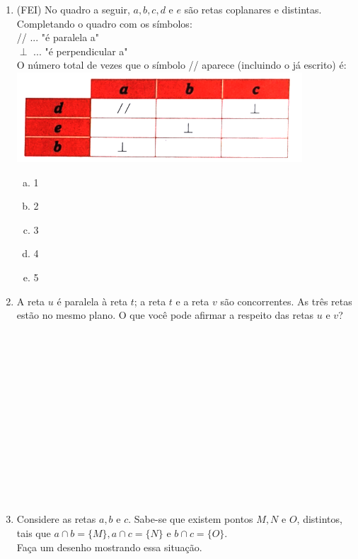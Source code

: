 \documentclass[a4paper,14pt]{article}
\begin{document}
\begin{multicols}{2}
\begin{enumerate}
   			\item (FEI) No quadro a seguir, $a, b, c, d$ e $e$ são retas coplanares e distintas. Completando o quadro com os símbolos: \\ // ... "é paralela a" ~~~~~~~~~~~~ \\ $\perp$ ... "é perpendicular a" \\ O número total de vezes que o símbolo // aparece (incluindo o já escrito) é:
   			\includegraphics[width=1\linewidth]{6FMA69_imagens/imagem6} \\
   			\begin{enumerate}[a)]
   				\item 1
   				\item 2
   				\item 3
   				\item 4
   				\item 5
   			\end{enumerate}
   			\item A reta $u$ é paralela à reta $t$; a reta $t$ e a reta $v$ são concorrentes. As três retas estão no mesmo plano. O que você pode afirmar a respeito das retas $u$ e $v$? \\\\\\\\\\\\\\\\\\\\\\\\\\\\
   			\item Considere as retas $a, b$ e $c$. Sabe-se que existem pontos $M, N$ e $O$, distintos, tais que $a \cap b = \{M\}, a \cap c = \{N\}$ e $b \cap c = \{O\}$. \\
   			Faça um desenho mostrando essa situação.
	    \end{enumerate} 

\end{multicols}
\end{document}
